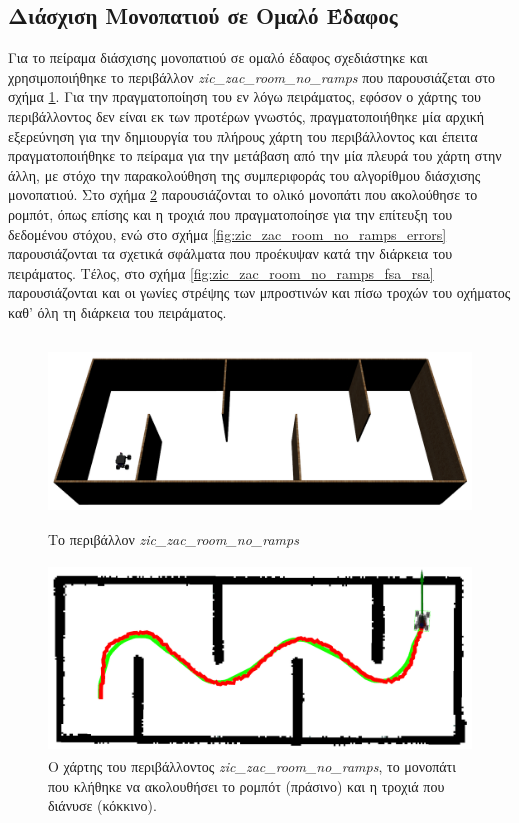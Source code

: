 \subsection{Διάσχιση Μονοπατιού σε Ομαλό Έδαφος}
Για το πείραμα διάσχισης μονοπατιού σε ομαλό έδαφος σχεδιάστηκε και χρησιμοποιήθηκε το περιβάλλον \textit{zic{\_}zac{\_}room{\_}no{\_}ramps} που παρουσιάζεται στο σχήμα \ref{fig:zic_zac_room_no_ramps}. Για την πραγματοποίηση του εν λόγω πειράματος, εφόσον ο χάρτης του περιβάλλοντος δεν είναι εκ των προτέρων γνωστός, πραγματοποιήθηκε μία αρχική εξερεύνηση για την δημιουργία του πλήρους χάρτη του περιβάλλοντος και έπειτα πραγματοποιήθηκε το πείραμα για την μετάβαση από την μία πλευρά του χάρτη στην άλλη, με στόχο την παρακολούθηση της συμπεριφοράς του αλγορίθμου διάσχισης μονοπατιού. Στο σχήμα \ref{fig:zic_zac_room_no_ramps_path_and_traj} παρουσιάζονται το ολικό μονοπάτι που ακολούθησε το ρομπότ, όπως επίσης και η τροχιά που πραγματοποίησε για την επίτευξη του δεδομένου στόχου, ενώ στο σχήμα \ref{fig:zic_zac_room_no_ramps_errors} παρουσιάζονται τα σχετικά σφάλματα που προέκυψαν κατά την διάρκεια του πειράματος. Τέλος, στο σχήμα \ref{fig:zic_zac_room_no_ramps_fsa_rsa} παρουσιάζονται και οι γωνίες στρέψης των μπροστινών και πίσω τροχών του οχήματος καθ' όλη τη διάρκεια του πειράματος.

\begin{figure}[!ht]
	\centering
	\includegraphics[height=5cm]{Chapters/Chapter5/Figures/ptc_experiments/zic_zac_room_no_ramps.png}
	\caption{Το περιβάλλον \textit{zic{\_}zac{\_}room{\_}no{\_}ramps}}
	\label{fig:zic_zac_room_no_ramps}
\end{figure}	
	
\begin{figure}[!ht]
	\centering
	\includegraphics[height=5cm]{Chapters/Chapter5/Figures/ptc_experiments/zic_zac_room_no_ramps_path_and_traj.png}
	\caption{Ο χάρτης του περιβάλλοντος \textit{zic{\_}zac{\_}room{\_}no{\_}ramps}, το μονοπάτι που κλήθηκε να ακολουθήσει το ρομπότ (πράσινο) και η τροχιά που διάνυσε (κόκκινο).}
	\label{fig:zic_zac_room_no_ramps_path_and_traj}
\end{figure}


